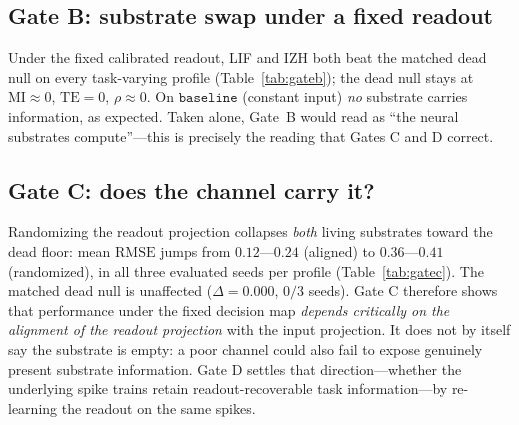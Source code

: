 \documentclass[10pt,a4paper]{article}
\newcommand{\RMSE}{\ensuremath{\mathrm{RMSE}}}
\newcommand{\MI}{\ensuremath{\mathrm{MI}}}
\newcommand{\TE}{\ensuremath{\mathrm{TE}}}
\begin{document}
\subsection{Gate B: substrate swap under a fixed readout}\label{sec:gateb}
\begin{table}[H]
\centering
\caption{Gate B: per-profile $\widehat{\RMSE}$, $\MI$ (nats), $\rho$
and $\TE$-significance under the fixed calibrated readout (5 profiles,
6 seeds). ``msd'' is the across-seed mean.}
\label{tab:gateb}

\end{table}
Under the fixed calibrated readout, LIF and IZH both beat the matched
dead null on every task-varying profile (Table~\ref{tab:gateb});
the dead null stays at $\MI\approx0$, $\TE=0$, $\rho\approx0$. On
$\mathtt{baseline}$ (constant input) \emph{no} substrate carries
information, as expected. Taken alone, Gate~B would read as ``the
neural substrates compute''---this is precisely the reading that Gates
C and D correct.

\subsection{Gate C: does the channel carry it?}\label{sec:gatecres}
\begin{table}[H]
\centering
\caption{Gate C: canonical $\RMSE$ under the aligned channel
($\mathbf{w}_r=\mathbf{g}$) vs.\ per-seed random readouts. ``$d$'' is
$\RMSE_{\mathrm{random}}-\RMSE_{\mathrm{aligned}}$; ``paired'' is the
fraction of seeds with $d>0$. Both living substrates collapse
(3/3 seeds); the matched dead null is unaffected.}
\label{tab:gatec}

\end{table}
Randomizing the readout projection collapses \emph{both} living
substrates toward the dead floor: mean $\RMSE$ jumps from $0.12$---$0.24$
(aligned) to $0.36$---$0.41$ (randomized), in all three evaluated seeds
per profile (Table~\ref{tab:gatec}). The matched dead null is
unaffected ($\Delta=0.000$, $0/3$ seeds). Gate C therefore shows that
performance under the fixed decision map \emph{depends critically on
the alignment of the readout projection} with the input projection.
It does not by itself say the substrate is empty: a poor channel could
also fail to expose genuinely present substrate information. Gate D
settles that direction---whether the underlying spike trains retain
readout-recoverable task information---by re-learning the readout on the
same spikes.
\end{document}
